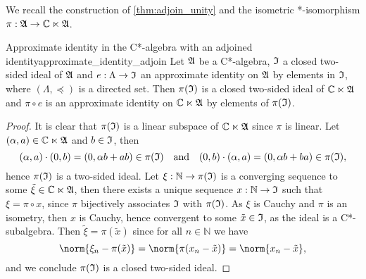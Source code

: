 We recall the construction of \cref{thm:adjoin_unity} and the isometric *-isomorphism \(\pi : \mathfrak{A} \to \mathbb{C} \ltimes \mathfrak{A}\).
\begin{lemma}{Approximate identity in the C*-algebra with an adjoined identity}{approximate_identity_adjoin}
    Let \(\mathfrak{A}\) be a C*-algebra, \(\mathfrak{I}\) a closed two-sided ideal of \(\mathfrak{A}\) and \(e : \Lambda \to \mathfrak{I}\) an approximate identity on \(\mathfrak{A}\) by elements in \(\mathfrak{I}\), where \((\Lambda, \preceq)\) is a directed set. Then \(\pi(\mathfrak{I})\) is a closed two-sided ideal of \(\mathbb{C} \ltimes \mathfrak{A}\) and \(\pi \circ e\) is an approximate identity on \(\mathbb{C} \ltimes \mathfrak{A}\) by elements of \(\pi(\mathfrak{I})\).
\end{lemma}
\begin{proof}
    It is clear that \(\pi(\mathfrak{I})\) is a linear subspace of \(\mathbb{C}\ltimes \mathfrak{A}\) since \(\pi\) is linear. Let \((\alpha, a) \in \mathbb{C} \ltimes \mathfrak{A}\) and \(b \in \mathfrak{I}\), then
    \begin{equation*}
        (\alpha, a)\cdot (0, b) = (0, \alpha b + ab) \in \pi(\mathfrak{I})
        \quad\text{and}\quad
        (0, b)\cdot (\alpha, a) = (0, \alpha b + ba) \in \pi(\mathfrak{I}),
    \end{equation*}
    hence \(\pi(\mathfrak{I})\) is a two-sided ideal. Let \(\xi : \mathbb{N} \to \pi(\mathfrak{I})\) is a converging sequence to some \(\tilde{\xi} \in \mathbb{C} \ltimes \mathfrak{A}\), then there exists a unique sequence \(x : \mathbb{N} \to \mathfrak{I}\) such that \(\xi = \pi\circ x\), since \(\pi\) bijectively associates \(\mathfrak{I}\) with \(\pi(\mathfrak{I})\). As \(\xi\) is Cauchy and \(\pi\) is an isometry, then \(x\) is Cauchy, hence convergent to some \(\tilde{x} \in \mathfrak{I}\), as the ideal is a C*-subalgebra. Then \(\tilde{\xi} = \pi(\tilde{x})\) since for all \(n \in \mathbb{N}\) we have
    \begin{equation*}
        \norm{\xi_n - \pi(\tilde{x})} = \norm{\pi(x_n - \tilde{x})} = \norm{x_n - \tilde{x}},
    \end{equation*}
    and we conclude \(\pi(\mathfrak{I})\) is a closed two-sided ideal.


\end{proof}
